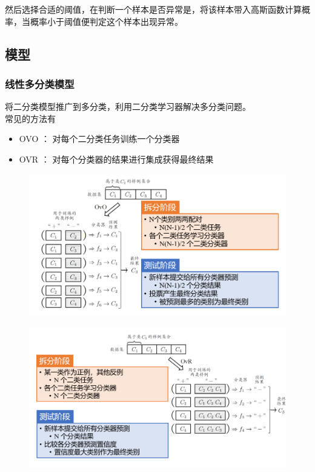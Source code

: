 \documentclass[12pt, a4paper, oneside]{ctexart}
\begin{document}
然后选择合适的阈值，在判断一个样本是否异常是，将该样本带入高斯函数计算概率，当概率小于阈值便判定这个样本出现异常。
\subsection{模型}
\subsubsection{线性多分类模型}
将二分类模型推广到多分类，利用二分类学习器解决多分类问题。\\
常见的方法有
\begin{itemize}
    \item OVO ： 对每个二分类任务训练一个分类器
    \item OVR ： 对每个分类器的结果进行集成获得最终结果
\end{itemize}

\begin{figure}[H]
    \centering
    \includegraphics[scale=0.5]{1.png}
\end{figure}

\begin{figure}[H]
    \centering
    \includegraphics[scale=0.5]{2.png}
\end{figure}
\end{document}
